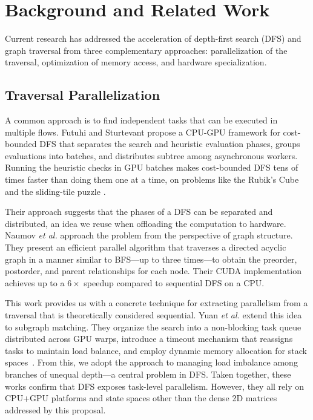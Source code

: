 \documentclass[conference]{IEEEtran}
\begin{document}

\section{Background and Related Work}

Current research has addressed the acceleration of depth-first search (DFS) and 
graph traversal from three complementary approaches: parallelization of the traversal, 
optimization of memory access, and hardware specialization.

\subsection{Traversal Parallelization}

A common approach is to find independent tasks that can be executed in multiple flows. Futuhi and Sturtevant 
propose a CPU-GPU framework for cost-bounded DFS that separates the search and 
heuristic evaluation phases, groups evaluations into batches, and distributes subtree 
among asynchronous workers. Running the heuristic checks in GPU batches makes cost-bounded DFS tens of times
faster than doing them one at a time, on problems like the Rubik's Cube and the
sliding-tile puzzle \cite{futuhi2025}. 

Their approach suggests that the phases of a DFS can be separated and distributed, 
an idea we reuse when offloading the computation to hardware. 
Naumov \textit{et al.} approach the problem from the perspective of 
graph structure. They present an efficient parallel algorithm that traverses a directed 
acyclic graph in a manner similar to BFS—up to three times—to obtain the preorder, postorder, 
and parent relationships for each node. Their CUDA implementation achieves up to a $6\times$ 
speedup compared to sequential DFS on a CPU\cite{naumov2017}. 

This work provides us with a concrete technique for extracting parallelism from a 
traversal that is theoretically considered sequential. Yuan \textit{et al.} extend 
this idea to subgraph matching. They organize the search into a non-blocking task 
queue distributed across GPU warps, introduce a timeout mechanism that reassigns tasks 
to maintain load balance, and employ dynamic memory allocation for stack spaces~\cite{yuan2024}. 
From this, we adopt the approach to managing load imbalance among branches of unequal 
depth—a central problem in DFS. Taken together, these works confirm that DFS exposes 
task-level parallelism. However, they all rely on CPU+GPU platforms and state spaces 
other than the dense 2D matrices addressed by this proposal.
\end{document}
